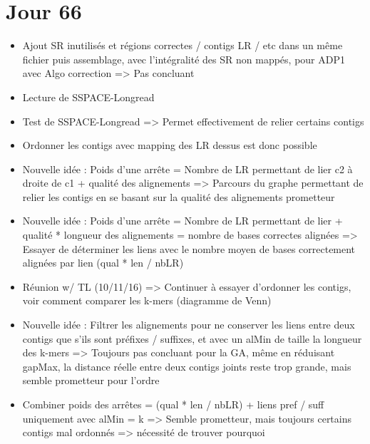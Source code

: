 \documentclass[12pt]{report}
\begin{document}
\section{Jour 66}

\begin{itemize}	
	\item Ajout SR inutilisés et régions correctes / contigs LR / etc dans un même fichier puis assemblage, avec l'intégralité
		  des SR non mappés, pour ADP1 avec Algo correction => Pas concluant
	
	\item Lecture de SSPACE-Longread
		  
	\item Test de SSPACE-Longread => Permet effectivement de relier certains contigs
	
	\item Ordonner les contigs avec mapping des LR dessus est donc possible
	
	\item Nouvelle idée : Poids d'une arrête = Nombre de LR permettant de lier c2 à droite de c1 + qualité des alignements
		  => Parcours du graphe permettant de relier les contigs en se basant sur la qualité des alignements prometteur
	
	\item Nouvelle idée : Poids d'une arrête = Nombre de LR permettant de lier + qualité * longueur des alignements = nombre de bases correctes alignées
		  => Essayer de déterminer les liens avec le nombre moyen de bases correctement alignées par lien (qual * len / nbLR)
	
	\item Réunion w/ TL (10/11/16) => Continuer à essayer d'ordonner les contigs, voir comment comparer les k-mers (diagramme de Venn)
	
	\item Nouvelle idée : Filtrer les alignements pour ne conserver les liens entre deux contigs que s'ils sont préfixes / suffixes,
		  et avec un alMin de taille la longueur des k-mers => Toujours pas concluant pour la GA, même en réduisant gapMax, la distance 
		  réelle entre deux contigs joints reste trop grande, mais semble prometteur pour l'ordre
		  
	\item Combiner poids des arrêtes = (qual * len / nbLR) + liens pref / suff uniquement avec alMin = k => Semble prometteur, mais
		  toujours certains contigs mal ordonnés => nécessité de trouver pourquoi
\end{itemize}
\end{document}
